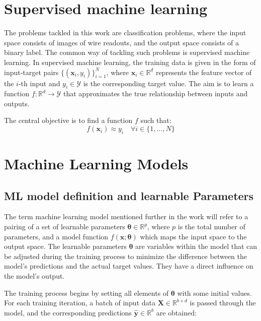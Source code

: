 \documentclass{pracalicmgr}
\begin{document}
\section{Supervised machine learning}

The problems tackled in this work are classification problems, where the input space consists of images of wire readouts, and the output space consists of a binary label. The common way of tackling such problems is supervised machine learning.
In supervised machine learning, the training data is given in the form of input-target pairs \( \{(\mathbf{x}_i, y_i)\}_{i=1}^N \), where \( \mathbf{x}_i \in \mathbb{R}^d \) represents the feature vector of the \( i \)-th input and \( y_i \in \mathcal{Y} \) is the corresponding target value. The aim is to learn a function \( f: \mathbb{R}^d \rightarrow \mathcal{Y} \) that approximates the true relationship between inputs and outputs.

The central objective is to find a function \( f \) such that:
\[
f(\mathbf{x}_i) \approx y_i \quad \forall i \in \{1, \dots, N\}
\]

\section{Machine Learning Models}

\subsection{ML model definition and learnable Parameters}

The term machine learning model mentioned further in the work will refer to a pairing of a set of learnable parameters \( \boldsymbol{\theta} \in \mathbb{R}^p \), where \( p \) is the total number of parameters, and a model function \( f(\mathbf{x}; \boldsymbol{\theta}) \) which maps the input space to the output space. The learnable parameters \( \boldsymbol{\theta} \) are variables within the model that can be adjusted during the training process to minimize the difference between the model's predictions and the actual target values. They have a direct influence on the model's output.


The training process begins by setting all elements of \( \boldsymbol{\theta} \) with some initial values. For each training iteration, a batch of input data \( \mathbf{X} \in \mathbb{R}^{b \times d} \) is passed through the model, and the corresponding predictions \( \hat{\mathbf{y}} \in \mathbb{R}^b \) are obtained:
\end{document}
